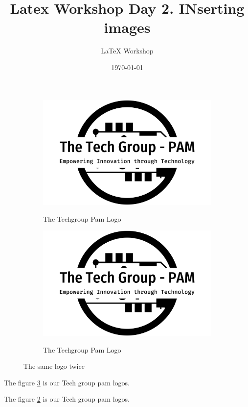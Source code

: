 \documentclass[14pt,]{book}
\title{Latex Workshop Day 2. INserting images}
\author{\LaTeX{} Workshop}
\date{\today}
\begin{document}
    \maketitle

    \begin{figure}[h!] %
        \begin{subfigure}[b]{0.4\linewidth}
            \caption{The Techgroup Pam Logo}
            \includegraphics[width=\linewidth]{the-tech-group-pam-high-resolution-logo-black-on-transparent-background_01.png}
            \label{labe1}
        \end{subfigure}
        \begin{subfigure}[b]{0.4\linewidth}
            \caption{The Techgroup Pam Logo}
            \includegraphics[width=\linewidth]{the-tech-group-pam-high-resolution-logo-black-on-transparent-background_01.png}
            \label{label2}
        \end{subfigure}
        \caption{The same logo twice}
        \label{fig:logos2}
    \end{figure}

    The figure \ref{fig:logos2} is our Tech group pam logos. 

    \newpage 

    The figure \ref{label2} is our Tech group pam logos. 
\end{document}
